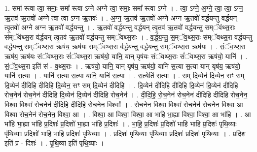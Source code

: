 \documentclass[17pt]{extarticle}
\begin{document}
1. समा᳚ स्त्वा त्वा॒ समाः॒ समा᳚ स्त्वा ऽग्ने अग्ने त्वा॒ समाः॒ समा᳚ स्त्वा ऽग्ने । . त्वा॒ ऽग्ने॒ अ॒ग्ने॒ त्वा॒ त्वा॒ ऽग्न॒ ऋ॒तव॑ ऋ॒तवो॑ अग्ने त्वा त्वा ऽग्न ऋ॒तवः॑ । . अ॒ग्न॒ ऋ॒तव॑ ऋ॒तवो॑ अग्ने अग्न ऋ॒तवो॑ वर्द्धयन्तु वर्द्धयन् त्वृ॒तवो॑ अग्ने अग्न ऋ॒तवो॑ वर्द्धयन्तु । . ऋ॒तवो॑ वर्द्धयन्तु वर्द्धयन् त्वृ॒तव॑ ऋ॒तवो॑ वर्द्धयन्तु सम्ॅवंथ्स॒राः स॑म्ॅवंथ्स॒रा 
व॑र्द्धयन् त्वृ॒तव॑ ऋ॒तवो॑ वर्द्धयन्तु सम्ॅवथ्स॒राः । . व॒र्द्ध॒य॒न्तु॒ स॒म्ॅव॒थ्स॒राः स॑म्ॅवथ्स॒रा व॑र्द्धयन्तु वर्द्धयन्तु सम्ॅवथ्स॒रा ऋष॑य॒ ऋष॑यः सम्ॅवथ्स॒रा व॑र्द्धयन्तु वर्द्धयन्तु स॑म्ॅवथ्स॒रा ऋष॑यः । . सं॒ॅव॒थ्स॒रा ऋष॑य॒ ऋष॑यः संॅवथ्स॒राः सं॑ॅवथ्स॒रा ऋष॑यो॒ यानि॒ यान् यृष॑यः संॅवथ्स॒राः सं॑ॅवथ्स॒रा ऋष॑यो॒ यानि॑ । . सं॒ॅव॒थ्स॒रा इति॑ सं - व॒थ्स॒राः । . ऋष॑यो॒ यानि॒ यान् यृष॑य॒ ऋष॑यो॒ यानि॑ स॒त्या स॒त्या यान् यृष॑य॒ ऋष॑यो॒ यानि॑ स॒त्या । . यानि॑ स॒त्या स॒त्या यानि॒ यानि॑ स॒त्या । . स॒त्येति॑ स॒त्या । . सम् दि॒व्येन॑ दि॒व्येन॒ सꣳ सम् दि॒व्येन॑ दीदिहि दीदिहि दि॒व्येन॒ सꣳ सम् दि॒व्येन॑ दीदिहि । . दि॒व्येन॑ दीदिहि दीदिहि दि॒व्येन॑ दि॒व्येन॑ दीदिहि रोच॒नेन॑ रोच॒नेन॑ दीदिहि दि॒व्येन॑ दि॒व्येन॑ दीदिहि रोच॒नेन॑ । . दी॒दि॒हि॒ रो॒च॒नेन॑ रोच॒नेन॑ दीदिहि दीदिहि रोच॒नेन॒ विश्वा॒ विश्वा॑ रोच॒नेन॑ दीदिहि दीदिहि रोच॒नेन॒ विश्वाः᳚ । . रो॒च॒नेन॒ विश्वा॒ विश्वा॑ रोच॒नेन॑ रोच॒नेन॒ विश्वा॒ आ विश्वा॑ रोच॒नेन॑ रोच॒नेन॒ विश्वा॒ आ । . विश्वा॒ आ विश्वा॒ विश्वा॒ आ भा॑हि भा॒ह्या विश्वा॒ विश्वा॒ आ भा॑हि । . आ भा॑हि भा॒ह्या भा॑हि प्र॒दिशः॑ प्र॒दिशो॑ भा॒ह्या भा॑हि प्र॒दिशः॑ । . भा॒हि॒ प्र॒दिशः॑ प्र॒दिशो॑ भाहि भाहि प्र॒दिशः॑ पृथि॒व्याः पृ॑थि॒व्याः प्र॒दिशो॑ भाहि भाहि प्र॒दिशः॑ पृथि॒व्याः । . प्र॒दिशः॑ पृथि॒व्याः पृ॑थि॒व्याः प्र॒दिशः॑ प्र॒दिशः॑ पृथि॒व्याः । . प्र॒दिश॒ इति॑ प्र - दिशः॑ । . पृ॒थि॒व्या इति॑ पृथि॒व्याः । \newline
\end{document}
